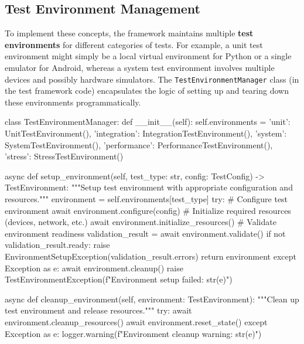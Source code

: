 \documentclass[11pt,a4paper]{report}
\begin{document}
\subsection{Test Environment Management}

To implement these concepts, the framework maintains multiple \textbf{test
environments} for different categories of tests. For example, a unit
test environment might simply be a local virtual environment for Python
or a single emulator for Android, whereas a system test environment
involves multiple devices and possibly hardware simulators. The
\texttt{TestEnvironmentManager} class (in the test framework code) encapsulates
the logic of setting up and tearing down these environments
programmatically.

    class TestEnvironmentManager:
        def _\_init__(self):
            self.environments = {
                'unit': UnitTestEnvironment(),
                'integration': IntegrationTestEnvironment(),
                'system': SystemTestEnvironment(),
                'performance': PerformanceTestEnvironment(),
                'stress': StressTestEnvironment()
            }

        async def setup\_environment(self, test\_type: str, config: TestConfig) -> TestEnvironment:
            """Setup test environment with appropriate configuration and resources."""
            environment = self.environments[test\_type]
            try:
                # Configure test environment
                await environment.configure(config)
                # Initialize required resources (devices, network, etc.)
                await environment.initialize\_resources()
                # Validate environment readiness
                validation\_result = await environment.validate()
                if not validation\_result.ready:
                    raise EnvironmentSetupException(validation\_result.errors)
                return environment
            except Exception as e:
                await environment.cleanup()
                raise TestEnvironmentException(f"Environment setup failed: {str(e)}")

        async def cleanup\_environment(self, environment: TestEnvironment):
            """Clean up test environment and release resources."""
            try:
                await environment.cleanup\_resources()
                await environment.reset\_state()
            except Exception as e:
                logger.warning(f"Environment cleanup warning: {str(e)}")
\end{document}
